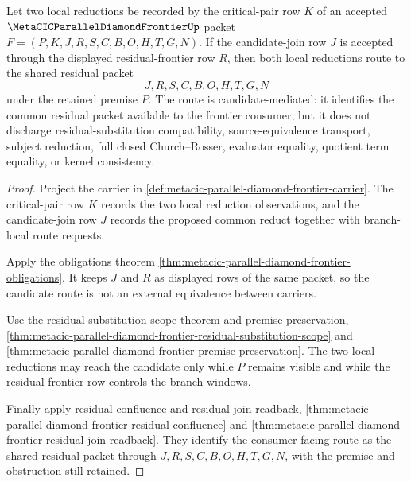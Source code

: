 \begin{theorem}
\label{thm:metacic-parallel-diamond-frontier-candidate-mediated-residual-route}
Let two local reductions be recorded by the critical-pair row $K$ of an accepted $\MetaCICParallelDiamondFrontierUp$ packet $F=(P,K,J,R,S,C,B,O,H,T,G,N)$. If the candidate-join row $J$ is accepted through the displayed residual-frontier row $R$, then both local reductions route to the shared residual packet
$$
J,R,S,C,B,O,H,T,G,N
$$
under the retained premise $P$. The route is candidate-mediated: it identifies the common residual packet available to the frontier consumer, but it does not discharge residual-substitution compatibility, source-equivalence transport, subject reduction, full closed Church--Rosser, evaluator equality, quotient term equality, or kernel consistency.
\end{theorem}
\begin{proof}
Project the carrier in \autoref{def:metacic-parallel-diamond-frontier-carrier}. The critical-pair row $K$ records the two local reduction observations, and the candidate-join row $J$ records the proposed common reduct together with branch-local route requests.

Apply the obligations theorem \autoref{thm:metacic-parallel-diamond-frontier-obligations}. It keeps $J$ and $R$ as displayed rows of the same packet, so the candidate route is not an external equivalence between carriers.

Use the residual-substitution scope theorem and premise preservation, \autoref{thm:metacic-parallel-diamond-frontier-residual-substitution-scope} and \autoref{thm:metacic-parallel-diamond-frontier-premise-preservation}. The two local reductions may reach the candidate only while $P$ remains visible and while the residual-frontier row controls the branch windows.

Finally apply residual confluence and residual-join readback, \autoref{thm:metacic-parallel-diamond-frontier-residual-confluence} and \autoref{thm:metacic-parallel-diamond-frontier-residual-join-readback}. They identify the consumer-facing route as the shared residual packet through $J,R,S,C,B,O,H,T,G,N$, with the premise and obstruction still retained.
\end{proof}

